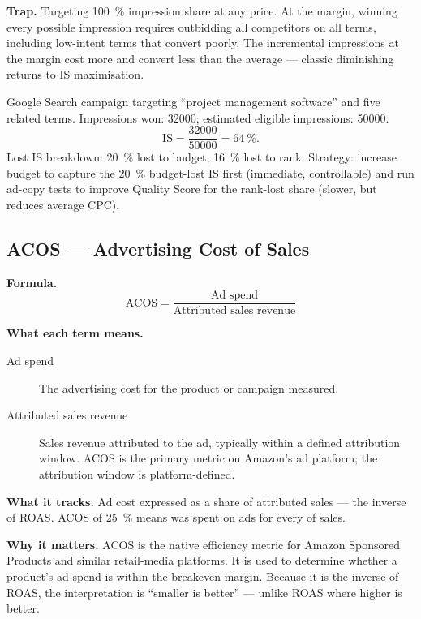 \textbf{Trap.} Targeting \qty{100}{\percent} impression share at any price. At the margin,
winning every possible impression requires outbidding all competitors on all terms, including
low-intent terms that convert poorly. The incremental impressions at the margin cost more
and convert less than the average --- classic diminishing returns to IS maximisation.

\begin{example}
Google Search campaign targeting ``project management software'' and five related terms.
Impressions won: \num{32000}; estimated eligible impressions: \num{50000}.
\[
  \text{IS} = \frac{32000}{50000} = \qty{64}{\percent}.
\]
Lost IS breakdown: \qty{20}{\percent} lost to budget, \qty{16}{\percent} lost to rank.
Strategy: increase budget to capture the \qty{20}{\percent} budget-lost IS first (immediate,
controllable) and run ad-copy tests to improve Quality Score for the rank-lost share (slower,
but reduces average CPC).
\end{example}


\subsection{ACOS --- Advertising Cost of Sales}

\textbf{Formula.}
\[
  \mathrm{ACOS} = \frac{\text{Ad spend}}{\text{Attributed sales revenue}}
\]

\textbf{What each term means.}
\begin{description}
  \item[Ad spend] The advertising cost for the product or campaign measured.
  \item[Attributed sales revenue] Sales revenue attributed to the ad, typically within a
    defined attribution window. ACOS is the primary metric on Amazon's ad platform; the
    attribution window is platform-defined.
\end{description}

\textbf{What it tracks.} Ad cost expressed as a share of attributed sales --- the inverse
of ROAS. ACOS of \qty{25}{\percent} means  was spent on ads for every
 of sales.

\textbf{Why it matters.} ACOS is the native efficiency metric for Amazon Sponsored Products
and similar retail-media platforms. It is used to determine whether a product's ad spend is
within the breakeven margin. Because it is the inverse of ROAS, the interpretation is
``smaller is better'' --- unlike ROAS where higher is better.


